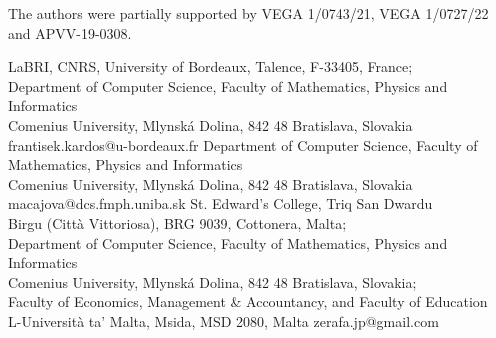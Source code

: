\documentclass[]{theclass}
\begin{document}
\begin{frontmatter}

{The authors were partially supported by VEGA 1/0743/21, VEGA 1/0727/22 and APVV-19-0308.}

{LaBRI, CNRS, University of Bordeaux, Talence, F-33405, France; \\ Department of Computer Science, Faculty of Mathematics, Physics and Informatics\\ Comenius University, Mlynsk\'{a} Dolina, 842 48 Bratislava, Slovakia}
{frantisek.kardos@u-bordeaux.fr}{}
{Department of Computer Science, Faculty of Mathematics, Physics and Informatics\\ Comenius University, Mlynsk\'{a} Dolina, 842 48 Bratislava, Slovakia}
{macajova@dcs.fmph.uniba.sk}{}
{St. Edward's College, Triq San Dwardu\\ Birgu (Citt\`{a} Vittoriosa), BRG 9039, Cottonera, Malta; \\ Department of Computer Science, Faculty of Mathematics, Physics and Informatics\\ Comenius University, Mlynsk\'{a} Dolina, 842 48 Bratislava, Slovakia; \\
Faculty of Economics, Management \& Accountancy, and Faculty of Education\\ L-Universit\`{a} ta' Malta, Msida, MSD 2080, Malta}
{zerafa.jp@gmail.com}
{}



\begin{abstract}
Let $G$ be a bridgeless cubic graph. In 2023, the three authors solved a conjecture (also known as the $S_4$-Conjecture) made by Mazzuoccolo in 2013: there exist two perfect matchings of $G$ such that the complement of their union is a bipartite subgraph of $G$. They actually show that given any $1^+$-factor $F$ (a spanning subgraph of $G$ such that its vertices have degree at least 1) and an arbitrary edge $e$ of $G$, there exists a perfect matching $M$ of $G$ containing $e$ such that $G\setminus (F\cup M)$ is bipartite. This is a step closer to comprehend better the Fan--Raspaud Conjecture and eventually the Berge--Fulkerson Conjecture. The $S_4$-Conjecture, now a theorem, is also the weakest assertion in a series of three conjectures made by Mazzuoccolo in 2013, with the next stronger statement being: there exist two perfect matchings of $G$ such that the complement of their union is an acyclic subgraph of $G$. Unfortunately, this conjecture is not true: Jin, Steffen, and Mazzuoccolo later showed that there exists a counterexample admitting 2-cuts. Here we show that, despite of this, every cyclically 3-edge-connected cubic graph satisfies this second conjecture. 
\end{abstract}

\end{frontmatter}
\end{document}
